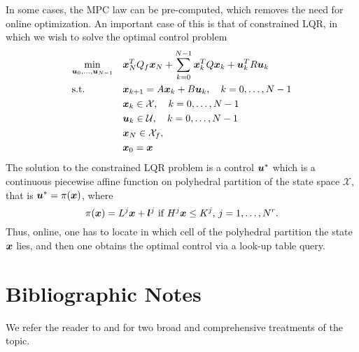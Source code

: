In some cases, the MPC law can be pre-computed, which removes the need for online optimization. An important case of this is that of constrained LQR, in which we wish to solve the optimal control problem
\begin{equation}
\begin{aligned}
\label{eq:ocp}
& \underset{\bm{u}_{0}, \ldots, \bm{u}_{N-1}}{\min} & & \bm{x}_N^T Q_f \bm{x}_N + \sum_{k=0}^{N-1} \bm{x}_k^T Q \bm{x}_k + \bm{u}_k^T R \bm{u}_k\\
& \textrm{s.t.} & & \bm{x}_{k+1} = A \bm{x}_{k} + B \bm{u}_{k}, \quad k = 0, \ldots, N-1 \\
& & & \bm{x}_{k} \in \mathcal{X},  \quad k = 0, \ldots, N-1 \\
& & & \bm{u}_{k} \in \mathcal{U},  \quad k = 0, \ldots, N-1 \\
& & & \bm{x}_{N} \in \mathcal{X}_f, \\
& & & \bm{x}_{0} = \bm{x}
\end{aligned}
\end{equation}
The solution to the constrained LQR problem is a control $\bm{u}^*$ which is a continuous piecewise affine function on polyhedral partition of the state space $\mathcal{X}$, that is $\bm{u}^* = \pi(\bm{x})$, where
\begin{equation}
    \pi(\bm{x}) = L^j \bm{x} + \bm{l}^j\,\,\text{if}\,\, H^j\bm{x} \leq K^j, \, j = 1, \ldots, N^r.
\end{equation}
Thus, online, one has to locate in which cell of the polyhedral partition the state $\bm{x}$ lies, and then one obtains the optimal control via a look-up table query.

\section{Bibliographic Notes}

We refer the reader to \cite{borrelli2017predictive} and \cite{rawlings2017model} for two broad and comprehensive treatments of the topic. 